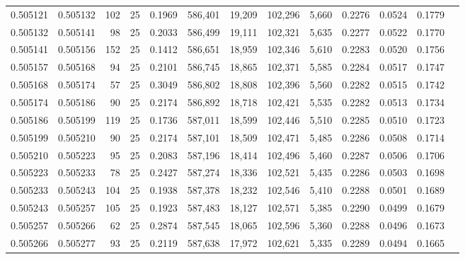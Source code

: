 \begin{tabular}{rrrrrrrrrrrrr}
0.505121 & 0.505132 & 102 &  25 &                                     0.1969 & 586,401 &  19,209 & 102,296 &   5,660 & 0.2276 & 0.0524 & 0.1779 \\
0.505132 & 0.505141 &  98 &  25 &                                     0.2033 & 586,499 &  19,111 & 102,321 &   5,635 & 0.2277 & 0.0522 & 0.1770 \\
0.505141 & 0.505156 & 152 &  25 &                                     0.1412 & 586,651 &  18,959 & 102,346 &   5,610 & 0.2283 & 0.0520 & 0.1756 \\
0.505157 & 0.505168 &  94 &  25 &                                     0.2101 & 586,745 &  18,865 & 102,371 &   5,585 & 0.2284 & 0.0517 & 0.1747 \\
0.505168 & 0.505174 &  57 &  25 &                                     0.3049 & 586,802 &  18,808 & 102,396 &   5,560 & 0.2282 & 0.0515 & 0.1742 \\
0.505174 & 0.505186 &  90 &  25 &                                     0.2174 & 586,892 &  18,718 & 102,421 &   5,535 & 0.2282 & 0.0513 & 0.1734 \\
0.505186 & 0.505199 & 119 &  25 &                                     0.1736 & 587,011 &  18,599 & 102,446 &   5,510 & 0.2285 & 0.0510 & 0.1723 \\
0.505199 & 0.505210 &  90 &  25 &                                     0.2174 & 587,101 &  18,509 & 102,471 &   5,485 & 0.2286 & 0.0508 & 0.1714 \\
0.505210 & 0.505223 &  95 &  25 &                                     0.2083 & 587,196 &  18,414 & 102,496 &   5,460 & 0.2287 & 0.0506 & 0.1706 \\
0.505223 & 0.505233 &  78 &  25 &                                     0.2427 & 587,274 &  18,336 & 102,521 &   5,435 & 0.2286 & 0.0503 & 0.1698 \\
0.505233 & 0.505243 & 104 &  25 &                                     0.1938 & 587,378 &  18,232 & 102,546 &   5,410 & 0.2288 & 0.0501 & 0.1689 \\
0.505243 & 0.505257 & 105 &  25 &                                     0.1923 & 587,483 &  18,127 & 102,571 &   5,385 & 0.2290 & 0.0499 & 0.1679 \\
0.505257 & 0.505266 &  62 &  25 &                                     0.2874 & 587,545 &  18,065 & 102,596 &   5,360 & 0.2288 & 0.0496 & 0.1673 \\
0.505266 & 0.505277 &  93 &  25 &                                     0.2119 & 587,638 &  17,972 & 102,621 &   5,335 & 0.2289 & 0.0494 & 0.1665 \\

\end{tabular}
